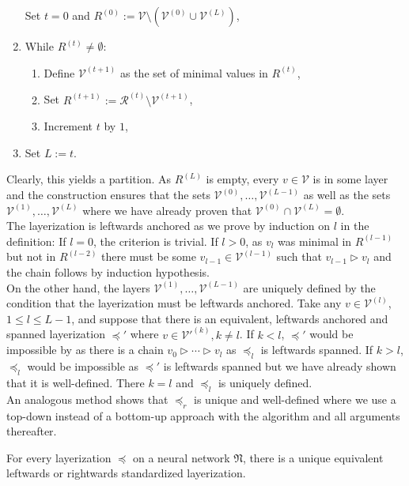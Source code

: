 \documentclass[a4paper,11pt]{report}
\begin{document}
\begin{Bew}
\begin{enumerate}
Set $t=0$ and $R^{(0)}:=\mathcal{V}\setminus\left(\mathcal{V}^{(0)}\cup\mathcal{V}^{(L)}\right)$,
\item
While $R^{(t)}\ne\emptyset$:
\begin{enumerate}
\item
Define $\mathcal{V}^{(t+1)}$ as the set of minimal values in $R^{(t)}$,
\item
Set $R^{(t+1)}:=\mathcal{R}^{(t)}\setminus\mathcal{V}^{(t+1)}$,
\item
Increment $t$ by $1$,
\end{enumerate}
\item
Set $L:= t$.
\end{enumerate}
Clearly, this yields a partition. As $R^{(L)}$ is empty, every $v\in\mathcal{V}$ is in some layer and the construction ensures that the sets $\mathcal{V}^{(0)},\dotsc,\mathcal{V}^{(L-1)}$ as well as the sets $\mathcal{V}^{(1)},\dotsc,\mathcal{V}^{(L)}$ where we have already proven that $\mathcal{V}^{(0)}\cap\mathcal{V}^{(L)}=\emptyset$.\\
The layerization is leftwards anchored as we prove by induction on $l$ in the definition: If $l=0$, the criterion is trivial. If $l>0$, as $v_l$ was minimal in $R^{(l-1)}$ but not in $R^{(l-2)}$ there must be some $v_{l-1}\in\mathcal{V}^{(l-1)}$ such that $v_{l-1}\triangleright v_l$ and the chain follows by induction hypothesis.\\
On the other hand, the layers $\mathcal{V}^{(1)},\dotsc,\mathcal{V}^{(L-1)}$ are uniquely defined by the condition that the layerization must be leftwards anchored. Take any $v\in\mathcal{V}^{(l)}$, $1\le l\le L-1$, and suppose that there is an equivalent, leftwards anchored and spanned layerization $\preceq'$ where $v\in\mathcal{V}'^{(k)},k\ne l$. If $k<l$, $\preceq'$ would be impossible by  as there is a chain $v_0\triangleright\dotsb\triangleright v_l$ as $\preceq_l$ is leftwards spanned. If $k>l$, $\preceq_l$ would be impossible as $\preceq'$ is leftwards spanned but we have already shown that it is well-defined. There $k=l$ and $\preceq_l$ is uniquely defined.\\
An analogous method shows that $\preceq_r$ is unique and well-defined where we use a top-down instead of a bottom-up approach with the algorithm and all arguments thereafter.
\end{Bew}

\begin{Cor}
For every layerization $\preceq$ on a neural network $\mathfrak{N}$, there is a unique equivalent leftwards or rightwards standardized layerization.
\end{Cor}
\end{document}
